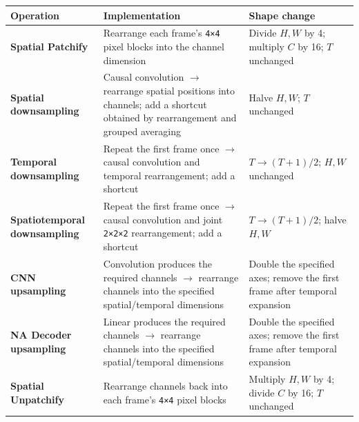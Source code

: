 \documentclass[
  11pt,
  a4paper,
]{article}
\newcounter{none} %
\begin{document}
{\def\LTcaptype{none} %
\begin{longtable}[]{@{}
  >{\raggedright\arraybackslash}p{}
  >{\raggedright\arraybackslash}p{}
  >{\raggedright\arraybackslash}p{}@{}}
\toprule\noalign{}
\begin{minipage}[b]{\linewidth}\raggedright
Operation
\end{minipage} & \begin{minipage}[b]{\linewidth}\raggedright
Implementation
\end{minipage} & \begin{minipage}[b]{\linewidth}\raggedright
Shape change
\end{minipage} \\
\midrule\noalign{}
\endhead
\bottomrule\noalign{}
\endlastfoot
\textbf{Spatial Patchify} & Rearrange each frame's \texttt{4×4} pixel
blocks into the channel dimension & Divide \(H,W\) by 4; multiply \(C\)
by 16; \(T\) unchanged \\
\textbf{Spatial downsampling} & Causal convolution \(\rightarrow\)
rearrange spatial positions into channels; add a shortcut obtained by
rearrangement and grouped averaging & Halve \(H,W\); \(T\) unchanged \\
\textbf{Temporal downsampling} & Repeat the first frame once
\(\rightarrow\) causal convolution and temporal rearrangement; add a
shortcut & \(T\rightarrow(T+1)/2\); \(H,W\) unchanged \\
\textbf{Spatiotemporal downsampling} & Repeat the first frame once
\(\rightarrow\) causal convolution and joint \texttt{2×2×2}
rearrangement; add a shortcut & \(T\rightarrow(T+1)/2\); halve
\(H,W\) \\
\textbf{CNN upsampling} & Convolution produces the required channels
\(\rightarrow\) rearrange channels into the specified spatial/temporal
dimensions & Double the specified axes; remove the first frame after
temporal expansion \\
\textbf{NA Decoder upsampling} & Linear produces the required channels
\(\rightarrow\) rearrange channels into the specified spatial/temporal
dimensions & Double the specified axes; remove the first frame after
temporal expansion \\
\textbf{Spatial Unpatchify} & Rearrange channels back into each frame's
\texttt{4×4} pixel blocks & Multiply \(H,W\) by 4; divide \(C\) by 16;
\(T\) unchanged \\
\end{longtable}
}
\end{document}
